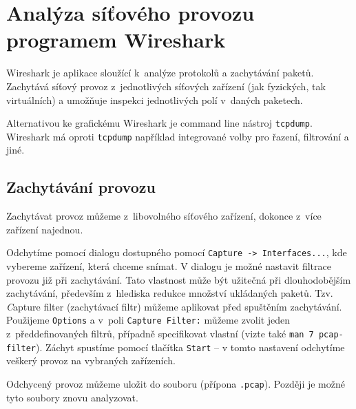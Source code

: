 \section{Analýza síťového provozu programem Wireshark}
\label{wireshark}

Wireshark je aplikace sloužící k~analýze protokolů a zachytávání paketů. Zachytává síťový provoz z~jednotlivých síťových zařízení (jak fyzických, tak virtuálních) a umožňuje inspekci jednotlivých polí v~daných paketech.

Alternativou ke grafickému Wireshark je command line nástroj \texttt{tcpdump}. Wireshark má oproti \texttt{tcpdump} například integrované volby pro řazení, filtrování a jiné.


\subsection{Zachytávání provozu}
Zachytávat provoz můžeme z~libovolného síťového zařízení, dokonce z~více zařízení najednou.

Odchytíme pomocí dialogu dostupného pomocí \texttt{Capture -> Interfaces...},
kde vybereme zařízení, která chceme snímat.
V dialogu je možné nastavit filtrace provozu již při zachytávání. Tato vlastnost může být užitečná při dlouhodobějším zachytávání, především z~hlediska redukce množství ukládaných paketů.
Tzv. {\emph Capture filter} (zachytávací filtr) můžeme aplikovat před spuštěním
zachytávání. Použijeme \texttt{Options} a v~poli \texttt{Capture Filter:} můžeme
zvolit jeden z~předdefinovaných filtrů, případně specifikovat vlastní (vizte
také \texttt{man 7 pcap-filter}).
Záchyt spustíme pomocí tlačítka
\texttt{Start} -- v tomto nastavení odchytíme veškerý provoz na vybraných zařízeních.

Odchycený provoz můžeme uložit do souboru (přípona \texttt{.pcap}). Později je možné tyto soubory znovu analyzovat.


